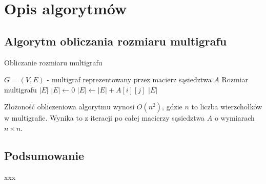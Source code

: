 \section{Opis algorytmów}

\subsection{Algorytm obliczania rozmiaru multigrafu}
\begin{algorithm}[H]
\caption{Obliczanie rozmiaru multigrafu}
\begin{algorithmic}[1]
\Require \( G = (V, E) \) - multigraf reprezentowany przez macierz sąsiedztwa \( A \)
\Ensure Rozmiar multigrafu \( |E| \)
\State \( |E| \gets 0 \)
    \State \( |E| \gets |E| + A[i][j] \)
\EndFor
\State \Return \( |E| \)
\end{algorithmic}
\end{algorithm}

Złożoność obliczeniowa algorytmu wynosi \( O(n^2) \), gdzie \( n \) to liczba wierzchołków w multigrafie. Wynika to z iteracji po całej macierzy sąsiedztwa \( A \) o wymiarach \( n \times n \).

\subsection{Podsumowanie}

xxx
